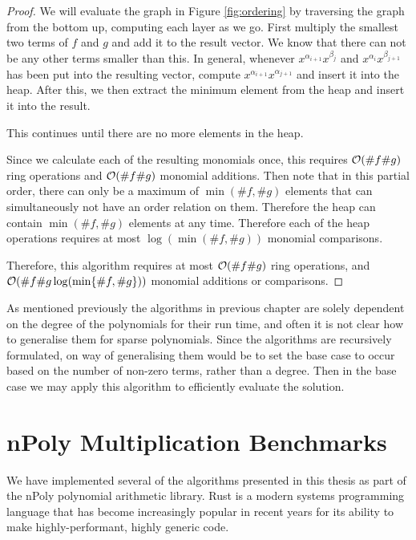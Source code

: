 \begin{proof}
    We will evaluate the graph in Figure \ref{fig:ordering} by traversing the graph from the bottom up, computing each layer as we go. 
    First multiply the smallest two terms of $f$ and $g$ and add it to the result vector. We know that there can not be any other terms smaller than this.
In general, whenever $x^{\alpha_{i+1}} x^{\beta_j}$ and $x^{\alpha_i} x^{\beta_{j+1}}$ has been put into the resulting vector, compute $x^{\alpha_{i+1}}x^{\alpha_{j+1}}$ and insert it into the heap. After this, we then extract the minimum element from the heap and insert it into the result.

    This continues until there are no more elements in the heap. 

    Since we calculate each of the resulting monomials once, this requires $\mathcal O(\# f \# g)$ ring operations and $\mathcal O(\# f \# g)$ monomial additions. Then note that in this partial order, there can only be a maximum of $\min(\# f, \# g)$ elements that can simultaneously not have an order relation on them. Therefore the heap can contain $\min(\# f, \# g)$ elements at any time. Therefore each of the heap operations requires at most $\log (\min(\# f, \# g))$ monomial comparisons.

    Therefore, this algorithm requires at most $\mathcal O(\# f \# g)$ ring operations, and $\mathcal O(\# f \# g \log ( \min \{\# f, \# g\}))$ monomial additions or comparisons.
    
\end{proof}

As mentioned previously the algorithms in previous chapter are solely dependent on the degree of the polynomials for their run time, and often it is not clear how to generalise them for sparse polynomials. Since the algorithms are recursively formulated, on way of generalising them would be to set the base case to occur based on the number of non-zero terms, rather than a degree. Then in the base case we may apply this algorithm to efficiently evaluate the solution.

\section{nPoly Multiplication Benchmarks}

We have implemented several of the algorithms presented in this thesis as part of the nPoly polynomial arithmetic library. Rust is a modern systems programming language that has become increasingly popular in recent years for its ability to make highly-performant, highly generic code.

